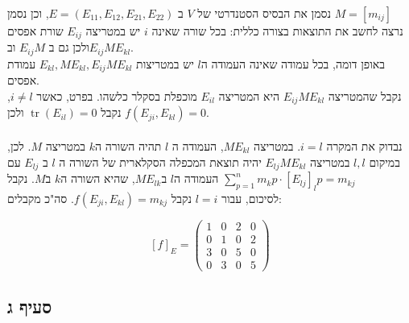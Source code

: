 \documentclass{article}
\DeclareMathOperator{\trace}{tr}
\begin{document}
נסמן את הבסיס הסטנדרטי של $V$ ב $E=(E_{11}, E_{12}, E_{21}, E_{22})$, וכן נסמן $M=[m_{ij}]$ \\
נרצה לחשב את התוצאות בצורה כללית: בכל שורה שאינה $i$ יש במטריצה $E_{ij}$ שורת אפסים ולכן גם ב $E_{ij}M$ וב$E_{ij}ME_{kl}$. \\
באופן דומה, בכל עמודה שאינה העמודה ה$l$ יש במטריצות $E_{kl}, ME_{kl}, E_{ij}ME_{kl}$ עמודת אפסים. \\
נקבל שהמטריצה $E_{ij}ME_{kl}$ היא המטריצה $E_{il}$ מוכפלת בסקלר כלשהו. בפרט, כאשר $i\ne l$, נקבל $\trace(E_{il})=0$ ולכן $f(E_{ji}, E_{kl})=0$.\\\\
נבדוק את המקרה $i=l$. במטריצה $ME_{kl}$, העמודה ה $l$ תהיה השורה ה$k$ במטריצה $M$. לכן, במיקום $l,l$ במטריצה $E_{lj}ME_{kl}$ יהיה תוצאת המכפלה הסקלארית של השורה ה $l$ ב $E_{lj}$ עם העמודה ה$l$ ב$ME_{lk}$, שהיא השורה ה$k$ ב$M$. נקבל $\sum_{p=1}^{n}m_kp \cdot [E_{lj}]_lp=m_{kj}$\\
לסיכום, עבור $l=i$ נקבל $f(E_{ji}, E_{kl})=m_{kj}$. סה"כ מקבלים:

\[
    [f]_E=\begin{pmatrix}
        1 & 0 & 2 & 0 \\
        0 & 1 & 0 & 2 \\
        3 & 0 & 5 & 0 \\
        0 & 3 & 0 & 5
    \end{pmatrix}
\]

\pagebreak

\subsection*{סעיף ג}
\end{document}

